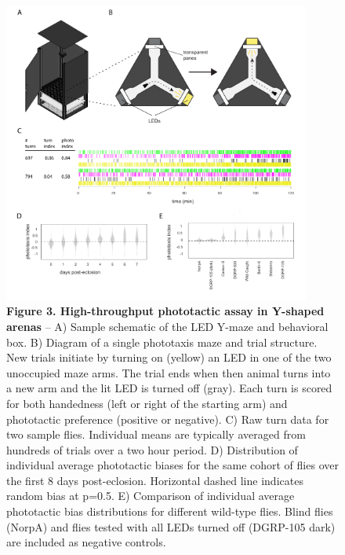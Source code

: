 \documentclass[10pt]{article}
\begin{document}
\newpage
\begin{figure}[h!]
	\begin{center}
		\includegraphics[width=0.9\textwidth]{../figures/LED_ymaze_panel.pdf}
	\end{center}
	\caption*{\footnotesize \textbf{Figure 3. High-throughput phototactic assay in Y-shaped arenas} -- A) Sample schematic of the LED Y-maze and behavioral box. B) Diagram of a single phototaxis maze and trial structure. New trials initiate by turning on (yellow) an LED in one of the two unoccupied maze arms. The trial ends when then animal turns into a new arm and the lit LED is turned off (gray). Each turn is scored for both handedness (left or right of the starting arm) and phototactic preference (positive or negative). C) Raw turn data for two sample flies. Individual means are typically averaged from hundreds of trials over a two hour period. D) Distribution of individual average phototactic biases for the same cohort of flies over the first 8 days post-eclosion. Horizontal dashed line indicates random bias at p=0.5. E) Comparison of individual average phototactic bias distributions for different wild-type flies. Blind flies (NorpA) and flies tested with all LEDs turned off (DGRP-105 dark) are included as negative controls.}
\end{figure}
\end{document}
